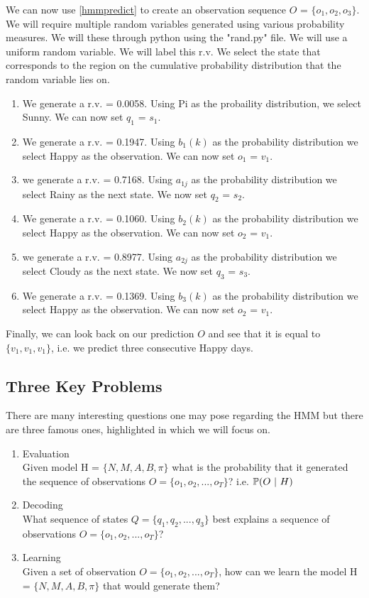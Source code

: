 \begin{example}
    We can now use \ref{hmmpredict} to create an observation sequence $O$ = $\{o_1, o_2, o_3\}$. We will require multiple random variables generated using various probability measures. We will these through python using the "rand.py" file. We will use a uniform random variable. We will label this r.v. We select the state that corresponds to the region on the cumulative probability distribution that the random variable lies on.
    \begin{enumerate}[i]
        \item We generate a r.v. = 0.0058. Using Pi as the probaility distribution, we select Sunny. We can now set $q_1$ = $s_1$.
        \item We generate a r.v. = 0.1947. Using $b_1(k)$ as the probability distribution we select Happy as the observation. We can now set $o_1$ = $v_1$.
        \item we generate a r.v. = 0.7168. Using $a_{1j}$ as the probability distribution we select Rainy as the next state. We now set $q_2$ = $s_2$.
        \item We generate a r.v. = 0.1060. Using $b_2(k)$ as the probability distribution we select Happy as the observation. We can now set $o_2$ = $v_1$.
        \item we generate a r.v. = 0.8977. Using $a_{2j}$ as the probability distribution we select Cloudy as the next state. We now set $q_3$ = $s_3$.
        \item We generate a r.v. = 0.1369. Using $b_3(k)$ as the probability distribution we select Happy as the observation. We can now set $o_2$ = $v_1$.
    \end{enumerate}
    Finally, we can look back on our prediction $O$ and see that it is equal to $\{v_1,v_1,v_1\}$, i.e. we predict three consecutive Happy days.
\end{example}


\subsection{Three Key Problems}
There are many interesting questions one may pose regarding the HMM but there are three famous ones, highlighted in \cite{1165342} which we will focus on. 
\begin{enumerate}
    \item \label{q:first} Evaluation \\ Given model H = $\{N,M,A,B,\pi\}$ what is the probability that it generated the sequence of observations $O = \{o_1,o_2,...,o_T\}$? i.e. $\mathbb{P} (O \ | \ H)$
    \item \label{q:second} Decoding \\ What sequence of states $Q = \{q_1, q_2,..., q_3\}$ best explains a sequence of observations $O = \{o_1,o_2,...,o_T\}$?
    \item \label{q:third} Learning \\ Given a set of observation $O = \{o_1,o_2,...,o_T\}$, how can we learn the model H = $\{N,M,A,B,\pi\}$ that would generate them?
\end{enumerate}


